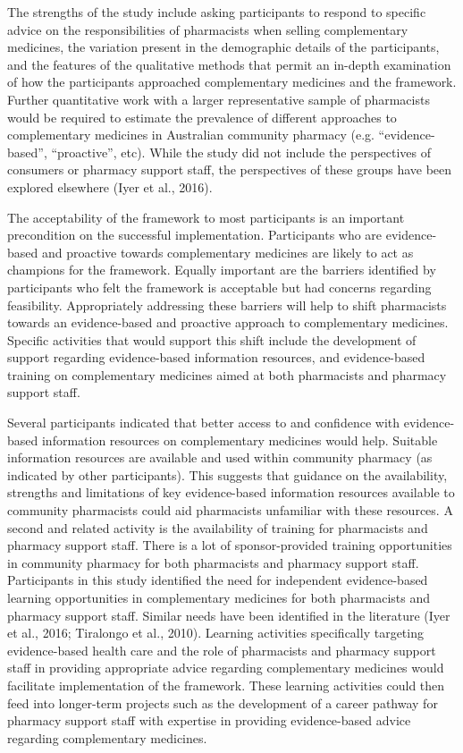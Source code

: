\documentclass[12pt,]{article}
\begin{document}
The strengths of the study include asking participants to respond to
specific advice on the responsibilities of pharmacists when selling
complementary medicines, the variation present in the demographic
details of the participants, and the features of the qualitative methods
that permit an in-depth examination of how the participants approached
complementary medicines and the framework. Further quantitative work
with a larger representative sample of pharmacists would be required to
estimate the prevalence of different approaches to complementary
medicines in Australian community pharmacy (e.g. ``evidence-based'',
``proactive'', etc). While the study did not include the perspectives of
consumers or pharmacy support staff, the perspectives of these groups
have been explored elsewhere (Iyer et al., 2016).

The acceptability of the framework to most participants is an important
precondition on the successful implementation. Participants who are
evidence-based and proactive towards complementary medicines are likely
to act as champions for the framework. Equally important are the
barriers identified by participants who felt the framework is acceptable
but had concerns regarding feasibility. Appropriately addressing these
barriers will help to shift pharmacists towards an evidence-based and
proactive approach to complementary medicines. Specific activities that
would support this shift include the development of support regarding
evidence-based information resources, and evidence-based training on
complementary medicines aimed at both pharmacists and pharmacy support
staff.

Several participants indicated that better access to and confidence with
evidence-based information resources on complementary medicines would
help. Suitable information resources are available and used within
community pharmacy (as indicated by other participants). This suggests
that guidance on the availability, strengths and limitations of key
evidence-based information resources available to community pharmacists
could aid pharmacists unfamiliar with these resources. A second and
related activity is the availability of training for pharmacists and
pharmacy support staff. There is a lot of sponsor-provided training
opportunities in community pharmacy for both pharmacists and pharmacy
support staff. Participants in this study identified the need for
independent evidence-based learning opportunities in complementary
medicines for both pharmacists and pharmacy support staff. Similar needs
have been identified in the literature (Iyer et al., 2016; Tiralongo et
al., 2010). Learning activities specifically targeting evidence-based
health care and the role of pharmacists and pharmacy support staff in
providing appropriate advice regarding complementary medicines would
facilitate implementation of the framework. These learning activities
could then feed into longer-term projects such as the development of a
career pathway for pharmacy support staff with expertise in providing
evidence-based advice regarding complementary medicines.
\end{document}
